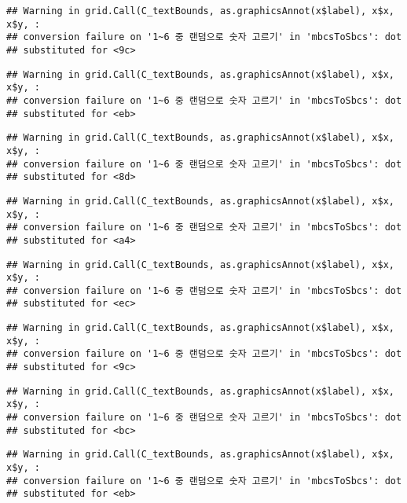 \documentclass[]{book}
\begin{document}
\begin{verbatim}
## Warning in grid.Call(C_textBounds, as.graphicsAnnot(x$label), x$x, x$y, :
## conversion failure on '1~6 중 랜덤으로 숫자 고르기' in 'mbcsToSbcs': dot
## substituted for <9c>
\end{verbatim}

\begin{verbatim}
## Warning in grid.Call(C_textBounds, as.graphicsAnnot(x$label), x$x, x$y, :
## conversion failure on '1~6 중 랜덤으로 숫자 고르기' in 'mbcsToSbcs': dot
## substituted for <eb>
\end{verbatim}

\begin{verbatim}
## Warning in grid.Call(C_textBounds, as.graphicsAnnot(x$label), x$x, x$y, :
## conversion failure on '1~6 중 랜덤으로 숫자 고르기' in 'mbcsToSbcs': dot
## substituted for <8d>
\end{verbatim}

\begin{verbatim}
## Warning in grid.Call(C_textBounds, as.graphicsAnnot(x$label), x$x, x$y, :
## conversion failure on '1~6 중 랜덤으로 숫자 고르기' in 'mbcsToSbcs': dot
## substituted for <a4>
\end{verbatim}

\begin{verbatim}
## Warning in grid.Call(C_textBounds, as.graphicsAnnot(x$label), x$x, x$y, :
## conversion failure on '1~6 중 랜덤으로 숫자 고르기' in 'mbcsToSbcs': dot
## substituted for <ec>
\end{verbatim}

\begin{verbatim}
## Warning in grid.Call(C_textBounds, as.graphicsAnnot(x$label), x$x, x$y, :
## conversion failure on '1~6 중 랜덤으로 숫자 고르기' in 'mbcsToSbcs': dot
## substituted for <9c>
\end{verbatim}

\begin{verbatim}
## Warning in grid.Call(C_textBounds, as.graphicsAnnot(x$label), x$x, x$y, :
## conversion failure on '1~6 중 랜덤으로 숫자 고르기' in 'mbcsToSbcs': dot
## substituted for <bc>
\end{verbatim}

\begin{verbatim}
## Warning in grid.Call(C_textBounds, as.graphicsAnnot(x$label), x$x, x$y, :
## conversion failure on '1~6 중 랜덤으로 숫자 고르기' in 'mbcsToSbcs': dot
## substituted for <eb>
\end{verbatim}
\end{document}
